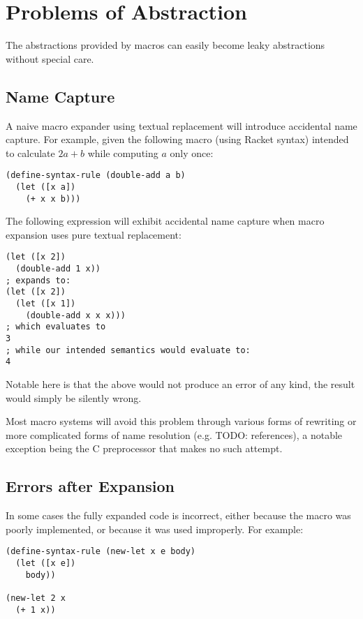 \documentclass{kththesis}
\begin{document}
\section{Problems of Abstraction} \label{sec:problem-abstraction}

The abstractions provided by macros can easily become leaky abstractions without special care.

\subsection{Name Capture}

A naive macro expander using textual replacement will introduce accidental name capture. For example, given the following macro (using Racket \cite{plt-tr1} syntax) intended to calculate $2a + b$ while computing $a$ only once:

\begin{verbatim}
(define-syntax-rule (double-add a b)
  (let ([x a])
    (+ x x b)))
\end{verbatim}

The following expression will exhibit accidental name capture when macro expansion uses pure textual replacement:

\begin{verbatim}
(let ([x 2])
  (double-add 1 x))
; expands to:
(let ([x 2])
  (let ([x 1])
    (double-add x x x)))
; which evaluates to
3
; while our intended semantics would evaluate to:
4
\end{verbatim}

Notable here is that the above would not produce an error of any kind, the result would simply be silently wrong.

Most macro systems will avoid this problem through various forms of rewriting or more complicated forms of name resolution (e.g. \cite{Flatt:2016:BSS:2837614.2837620} TODO: references), a notable exception being the C preprocessor that makes no such attempt.

\subsection{Errors after Expansion}

In some cases the fully expanded code is incorrect, either because the macro was poorly implemented, or because it was used improperly. For example:

\begin{verbatim}
(define-syntax-rule (new-let x e body)
  (let ([x e])
    body))

(new-let 2 x
  (+ 1 x))
\end{verbatim}
\end{document}
